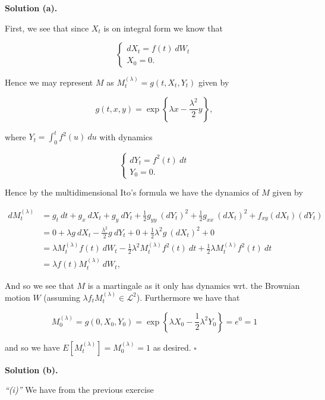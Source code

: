 \documentclass[
]{book}
\begin{document}
\noindent\makebox[\linewidth]{\rule{\textwidth}{0.4pt}}

\textbf{Solution (a).}

First, we see that since \(X_t\) is on integral form we know that

\[
\begin{cases}
dX_t=f(t)\ dW_t\\
X_0=0.
\end{cases}
\]

Hence we may represent \(M\) as \(M^{(\lambda)}_t=g(t,X_t,Y_t)\) given by

\[
g(t,x,y)=\exp\left\{\lambda x-\frac{\lambda^2}{2}y \right\},
\]

where \(Y_t=\int_0^t f^2(u)\ du\) with dynamics

\[
\begin{cases}
dY_t=f^2(t)\ dt\\
Y_0=0.
\end{cases}
\]

Hence by the multidimensional Ito's formula we have the dynamics of \(M\) given by

\begin{align*}
dM^{(\lambda)}_t&=g_t\ dt+g_x\ dX_t+g_y\ dY_t+\frac{1}{2}g_{yy}\ (dY_t)^2+\frac{1}{2}g_{xx}\ (dX_t)^2 +f_{xy}(dX_t)(dY_t)\\
&=0+\lambda g\ dX_t-\frac{\lambda^2}{2}g\ dY_t+0+\frac{1}{2}\lambda ^2g\ (dX_t)^2+0\\
&=\lambda M_t^{(\lambda)} f(t)\ dW_t-\frac{1}{2}\lambda^2M_t^{(\lambda)} f^2(t)\ dt+\frac{1}{2}\lambda M_t^{(\lambda)} f^2(t)\ dt\\
&=\lambda f(t)M_t^{(\lambda)}\ dW_t,
\end{align*}

And so we see that \(M\) is a martingale as it only has dynamics wrt. the Brownian motion \(W\) (assuming \(\lambda f_tM_t^{(\lambda)}\in\mathcal{L}^2\)). Furthermore we have that

\[
M_0^{(\lambda)}=g(0,X_0,Y_0)=\exp\left\{\lambda X_0-\frac{1}{2}\lambda ^2 Y_0\right\}=e^0=1
\]

and so we have \(E[M_t^{(\lambda)}]=M_0^{(\lambda)}=1\) as desired. \(\square\)

\noindent\makebox[\linewidth]{\rule{\textwidth}{0.4pt}}

\textbf{Solution (b).}

\emph{``(i)''} We have from the previous exercise
\end{document}
